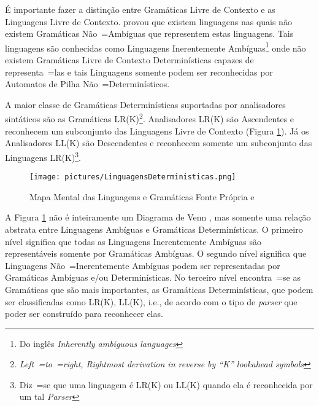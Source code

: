 {    É importante fazer a distinção entre Gramáticas Livre de Contexto e
    as Linguagens Livre de Contexto.
     provou que existem linguagens nas quais não
    existem Gramáticas Não~=Ambíguas que representem estas linguagens.
    Tais linguagens são conhecidas como Linguagens Inerentemente Ambíguas\footnote{Do
    inglês \textit{Inherently ambiguous languages}} onde não existem Gramáticas
    Livre de Contexto Determinísticas capazes de representa~=las e
    tais Linguagens somente podem ser reconhecidas por Automatos de Pilha Não~=Determinísticos.

    A maior classe de Gramáticas Determinísticas suportadas por analisadores
    sintáticos são as Gramáticas LR(K)\footnote{\textit{Left~=to~=right,
    Rightmost derivation in reverse by ``K'' lookahead symbols
    }}.
    Analisadores LR(K) \cite{ahoCompilerDragonBook} são Ascendentes e
    reconhecem um subconjunto das Linguagens Livre de Contexto
    (Figura \ref{fig:pictures/LinguagensDeterministicas.png}).
    Já os Analisadores LL(K) são Descendentes e
    reconhecem somente um subconjunto das Linguagens LR(K)\footnote{Diz~=se que uma
    linguagem é LR(K) ou LL(K) quando ela é reconhecida por um tal \textit{Parser}}.
    \begin{figure}[H]
    \centering
    \texttt{[image: pictures/LinguagensDeterministicas.png]}
    \caption{Mapa Mental das Linguagens e
    Gramáticas \newline Fonte Própria  e
    }
    \label{fig:pictures/LinguagensDeterministicas.png}
    \end{figure}

    A Figura \ref{fig:pictures/LinguagensDeterministicas.png} não é
    inteiramente um Diagrama de Venn \cite{generalizedVennDiagrams},
    mas somente uma relação abstrata entre Linguagens Ambíguas e
    Gramáticas Determinísticas.
    O primeiro nível significa que todas as Linguagens Inerentemente
    Ambíguas são representáveis somente por Gramáticas Ambíguas.
    O segundo nível significa que Linguagens Não~=Inerentemente Ambíguas podem
    ser representadas por Gramáticas Ambíguas e\slash{}ou Determinísticas.
    No terceiro nível encontra~=se as Gramáticas que são mais importantes,
    as Gramáticas Determinísticas,
    que podem ser classificadas como LR(K),
    LL(K), i.e.,
    de acordo com o tipo de \textit{parser} que poder ser construído para reconhecer elas.

}
